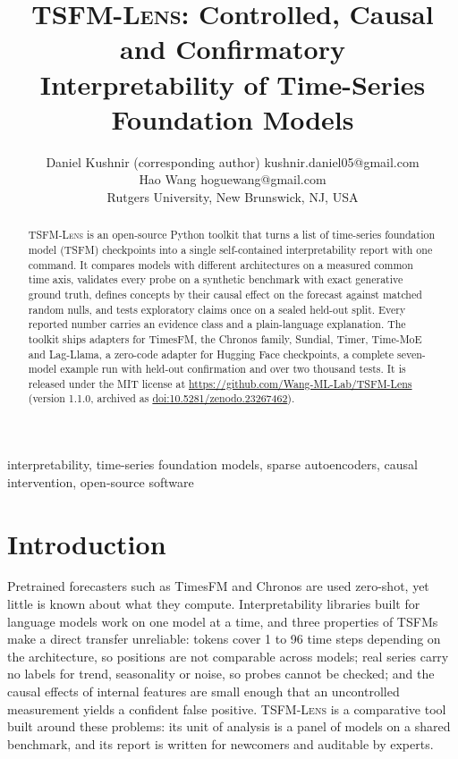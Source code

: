 \documentclass[twoside,11pt]{article}
\newcommand{\repourl}{https://github.com/Wang-ML-Lab/TSFM-Lens}
\newcommand{\tool}{\textsc{TSFM-Lens}}
\begin{document}
\title{\tool: Controlled, Causal and Confirmatory\\ Interpretability of Time-Series Foundation Models}

\author{\name Daniel Kushnir (corresponding author) \email kushnir.daniel05@gmail.com \\
       \name Hao Wang \email hoguewang@gmail.com \\
       \addr Rutgers University, New Brunswick, NJ, USA}

\editor{}

\maketitle

\begin{abstract}%
\tool{} is an open-source Python toolkit that turns a list of time-series foundation model (TSFM)
checkpoints into a single self-contained interpretability report with one command. It compares models
with different architectures on a measured common time axis, validates every probe on a synthetic
benchmark with exact generative ground truth, defines concepts by their causal effect on the forecast
against matched random nulls, and tests exploratory claims once on a sealed held-out split. Every
reported number carries an evidence class and a plain-language explanation. The toolkit ships adapters
for TimesFM, the Chronos family, Sundial, Timer, Time-MoE and Lag-Llama, a zero-code adapter for Hugging Face
checkpoints, a complete seven-model example run with held-out confirmation and over two thousand tests. It is released under the
MIT license at \url{\repourl} (version 1.1.0, archived as \href{https://doi.org/10.5281/zenodo.23267462}{doi:10.5281/zenodo.23267462}).
\end{abstract}

\begin{keywords}
  interpretability, time-series foundation models, sparse autoencoders, causal intervention, open-source software
\end{keywords}

\section{Introduction}

Pretrained forecasters such as TimesFM \citep{das2024timesfm} and Chronos \citep{ansari2024chronos}
are used zero-shot, yet little is known about what they
compute. Interpretability libraries built for language models work on one model at a time, and three properties of
TSFMs make a direct transfer unreliable: tokens cover 1 to 96 time steps depending on the architecture, so positions
are not comparable across models; real series carry no labels for trend, seasonality or noise, so probes cannot be
checked; and the causal effects of internal features are small enough that an uncontrolled measurement yields a
confident false positive. \tool{} is a comparative tool built around these problems: its unit of analysis is a panel
of models on a shared benchmark, and its report is written for newcomers and auditable by experts.
\end{document}
